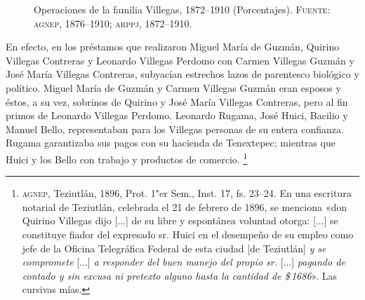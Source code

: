 \documentclass[14pt,twoside,final]{extbook} %
\let\oldfootnote\footnote
\renewcommand\footnote[1]{%
\oldfootnote{\hspace{1mm}#1}}
\begin{document}
\begin{figure}
\centering
{}
\caption[Operaciones de la familia Villegas, 1872--1910 (Porcentajes)]{Operaciones de la familia Villegas, 1872--1910 (Porcentajes). \textsc{Fuente:} \textsc{agnep}, 1876--1910; \textsc{arppj}, 1872--1910.}
\label{fig:porcentajes}
\end{figure}

En efecto, en los préstamos que realizaron Miguel María de Guzmán, Quirino Villegas Contreras y Leonardo Villegas Perdomo con Carmen Villegas Guzmán y José María Villegas Contreras, subyacían estrechos lazos de parentesco biológico y político. Miguel María de Guzmán y Carmen Villegas Guzmán eran esposos y éstos, a su vez, sobrinos de Quirino y José María Villegas Contreras, pero al fin primos de Leonardo Villegas Perdomo. Leonardo Rugama, José Huici, Bacilio y Manuel Bello, representaban para los Villegas personas de su entera confianza. Rugama garantizaba sus pagos con su hacienda de Tenextepec; mientras que Huici y los Bello con trabajo y productos de comercio.\footnote{\textsc{agnep}, Teziutlán, 1896, Prot. 1"er Sem., Inst. 17, fs. 23--24. En una escritura notarial de Teziutlán,\index[lugares]{Teziutlan@Teziutlán} celebrada el 21 de febrero de 1896, se menciona «don Quirino Villegas dijo [...] de su libre y espontánea voluntad otorga: [...] se constituye fiador del expresado sr. Huici en el desempeño de su empleo como jefe de la Oficina Telegráfica Federal de esta ciudad [de Teziutlán] \emph{y se compromete} [...] \emph{a responder del buen manejo del propio sr.} [...] \emph{pagando de contado y sin excusa ni pretexto alguno hasta la cantidad de \$\,1686}». Las cursivas mías.}
\end{document}
